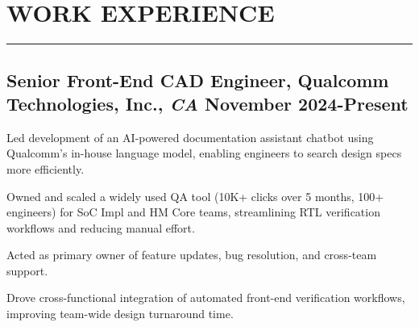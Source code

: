 \documentclass[10pt]{article}
\begin{document}
\vspace{0.1in}

\section*{\MakeUppercase{Work Experience}}
\hrule
\medskip
\subsection*{Senior Front-End CAD Engineer{\normalfont, Qualcomm Technologies, Inc.,
            \textit{CA} \hfill
            November 2024-Present}}
\begin{asparaitem}
    \item Led development of an AI-powered documentation assistant chatbot using Qualcomm's in-house language model, enabling engineers to search design specs more efficiently.


    \item Owned and scaled a widely used QA tool (10K+ clicks over 5 months, 100+ engineers) for SoC Impl and HM Core teams, streamlining RTL verification workflows and reducing manual effort.
    \item Acted as primary owner of feature updates, bug resolution, and cross-team support.
    
    \item Drove cross-functional integration of automated front-end verification workflows, improving team-wide design turnaround time.
\end{asparaitem}
\end{document}
